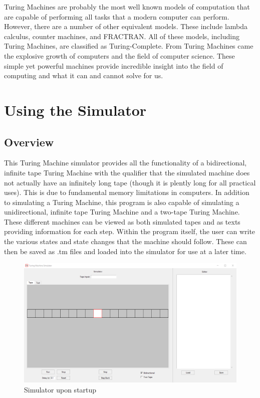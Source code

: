 \documentclass[12pt,letterpaper]{article}
\begin{document}
\noindent Turing Machines are probably the most well known models of computation that are capable of performing all tasks that a modern computer can perform. However, there are a number of other equivalent models. These include lambda calculus, counter machines, and FRACTRAN. All of these models, including Turing Machines, are classified as Turing-Complete. From Turing Machines came the explosive growth of computers and the field of computer science. These simple yet powerful machines provide incredible insight into the field of computing and what it can and cannot solve for us.

\section{Using the Simulator}

\subsection{Overview}
	\noindent This Turing Machine simulator provides all the functionality of a bidirectional, infinite tape Turing Machine with the qualifier that the simulated machine does not actually have an infinitely long tape (though it is plently long for all practical uses). This is due to fundamental memory limitations in computers. In addition to simulating a Turing Machine, this program is also capable of simulating a unidirectional, infinite tape Turing Machine and a two-tape Turing Machine. These different machines can be viewed as both simulated tapes and as texts providing information for each step. Within the program itself, the user can write the various states and state changes that the machine should follow. These can then be saved as .tm files and loaded into the simulator for use at a later time.
	
\begin{figure}[hbt!]
	\includegraphics[scale=.4]{images/simulator_blank.png}
	\caption{Simulator upon startup}
\end{figure}
\end{document}
